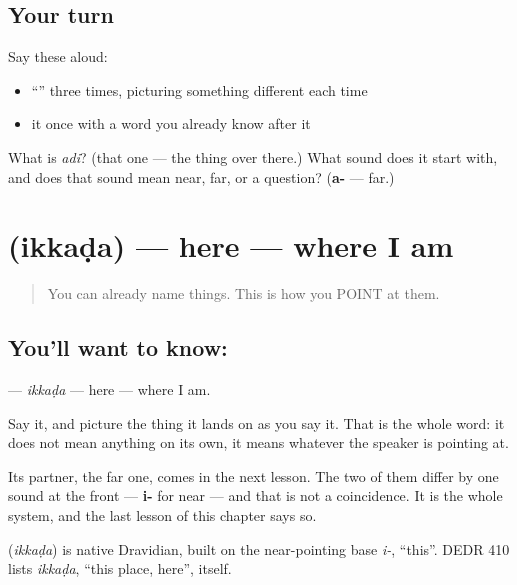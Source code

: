 \subsection*{Your turn}
Say these aloud:

\begin{itemize}
\raggedright
  \item \textquotedblleft{}\textquotedblright{} three times, picturing something different each time
  \item it once with a word you already know after it
\end{itemize}

\begin{tcolorbox}[breakable,colback=teal!4,colframe=teal!35!black,title={Before you move on}]
What is \emph{adi}? (that one — the thing over there.) What sound does it start with, and does that sound mean near, far, or a question? (\textbf{a-} — far.)
\end{tcolorbox}
\section[\texorpdfstring{\te{ఇక్కడ} (ikkaḍa)}{ఇక్కడ (ikkaḍa)}]{ (ikkaḍa) — here — where I am}

\label{lesson:TE-C41-here}



\begin{quote}
You can already name things. This is how you POINT at them.
\end{quote}

\subsection*{You'll want to know: }
\textbf{} — \emph{ikkaḍa} — here — where I am.

Say it, and picture the thing it lands on as you say it. That is the whole word: it does not mean anything on its own, it means whatever the speaker is pointing at.

Its partner, the far one, comes in the next lesson. The two of them differ by one sound at the front — \textbf{i-} for near — and that is not a coincidence. It is the whole system, and the last lesson of this chapter says so.

\begin{cousinweb}
\textbf{} (\emph{ikkaḍa}) is native Dravidian, built on the near-pointing base \emph{i-}, \textquotedblleft{}this\textquotedblright{}. DEDR 410 lists \emph{ikkaḍa}, \textquotedblleft{}this place, here\textquotedblright{}, itself.
\end{cousinweb}

